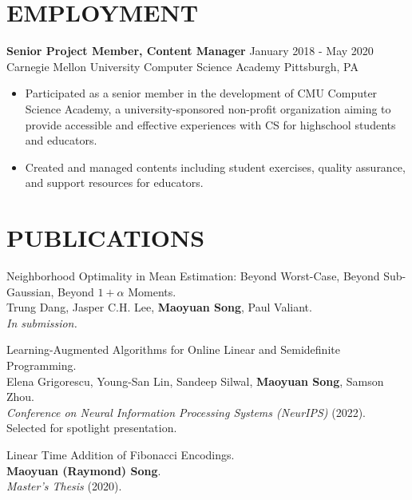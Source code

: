 \documentclass[margin, 10pt]{res} %
\begin{document}
\begin{resume}
\section{EMPLOYMENT}

{\bf Senior Project Member, Content Manager} \hfill January 2018 - May 2020 \\
Carnegie Mellon University Computer Science Academy \hfill Pittsburgh, PA

\begin{itemize}
\item Participated as a senior member in the development of CMU Computer Science Academy, a university-sponsored non-profit organization aiming to provide accessible and effective experiences with CS for highschool students and educators.
\item Created and managed contents including student exercises, quality assurance, and support resources for educators.
\end{itemize} 


\section{PUBLICATIONS}
\begin{etaremune}
\item Neighborhood Optimality in Mean Estimation: Beyond Worst-Case, Beyond Sub-Gaussian, Beyond $1 + \alpha$ Moments.\\
Trung Dang, Jasper C.H. Lee, {\bf Maoyuan Song}, Paul Valiant.\\
\emph{In submission.}
\item Learning-Augmented Algorithms for Online Linear and Semidefinite Programming.\\
Elena Grigorescu, Young-San Lin, Sandeep Silwal, {\bf Maoyuan Song}, Samson Zhou.\\
\emph{Conference on Neural Information Processing Systems (NeurIPS)} (2022). Selected for spotlight presentation.
\item Linear Time Addition of Fibonacci Encodings.\\
{\bf Maoyuan (Raymond) Song}.\\
\emph{Master's Thesis} (2020). 
\end{etaremune}



\end{resume}
\end{document}
